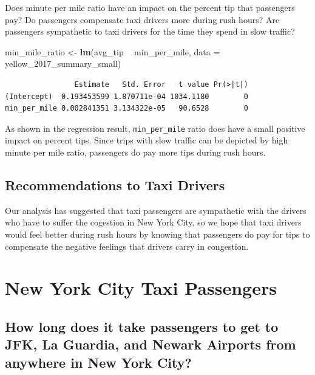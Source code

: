 \documentclass[12pt,twoside]{reedthesis}
\newenvironment{Shaded}{\begin{snugshade}}{\end{snugshade}}
\newcommand{\KeywordTok}[1]{\textcolor[rgb]{0.13,0.29,0.53}{\textbf{#1}}}
\newcommand{\DataTypeTok}[1]{\textcolor[rgb]{0.13,0.29,0.53}{#1}}
\newcommand{\StringTok}[1]{\textcolor[rgb]{0.31,0.60,0.02}{#1}}
\newcommand{\OperatorTok}[1]{\textcolor[rgb]{0.81,0.36,0.00}{\textbf{#1}}}
\newcommand{\NormalTok}[1]{#1}
\theoremstyle{definition}
\theoremstyle{definition}
\theoremstyle{definition}
\theoremstyle{remark}
\begin{document}
Does minute per mile ratio have an impact on the percent tip that
passengers pay? Do passengers compensate taxi drivers more during rush
hours? Are passengers sympathetic to taxi drivers for the time they
spend in slow traffic?
\begin{Shaded}
\begin{Highlighting}[]
\NormalTok{min_mile_ratio <-}\StringTok{ }\KeywordTok{lm}\NormalTok{(avg_tip }\OperatorTok{~}\StringTok{ }\NormalTok{min_per_mile, }\DataTypeTok{data =}\NormalTok{ yellow_2017_summary_small)}
\end{Highlighting}
\end{Shaded}
\begin{verbatim}
                Estimate   Std. Error   t value Pr(>|t|)
(Intercept)  0.193453599 1.870711e-04 1034.1180        0
min_per_mile 0.002841351 3.134322e-05   90.6528        0
\end{verbatim}
As shown in the regression result, \texttt{min\_per\_mile} ratio does
have a small positive impact on percent tips. Since trips with slow
traffic can be depicted by high minute per mile ratio, passengers do pay
more tips during rush hours.

\section{Recommendations to Taxi
Drivers}\label{recommendations-to-taxi-drivers}

Our analysis has suggested that taxi passengers are sympathetic with the
drivers who have to suffer the cogestion in New York City, so we hope
that taxi drivers would feel better during rush hours by knowing that
passengers do pay for tips to compensate the negative feelings that
drivers carry in congestion.

\chapter{New York City Taxi Passengers}\label{chapter4}

\section{How long does it take passengers to get to JFK, La Guardia, and
Newark Airports from anywhere in New York
City?}\label{how-long-does-it-take-passengers-to-get-to-jfk-la-guardia-and-newark-airports-from-anywhere-in-new-york-city}
\end{document}
